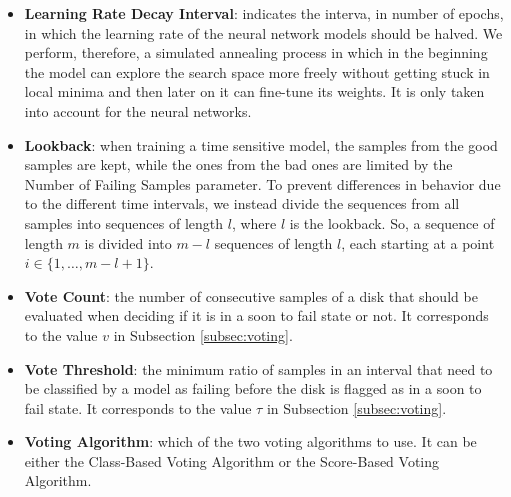 \begin{itemize}
  \item \textbf{Learning Rate Decay Interval}: indicates the interva, in number of epochs, in which the learning rate of the neural network models should be halved.
  We perform, therefore, a simulated annealing process in which in the beginning the model can explore the search space more freely without getting stuck in local minima and then later on it can fine-tune its weights.
  It is only taken into account for the neural networks.

  \item \textbf{Lookback}: when training a time sensitive model, the samples from the good samples are kept, while the ones from the bad ones are limited by the Number of Failing Samples parameter.
  To prevent differences in behavior due to the different time intervals, we instead divide the sequences from all samples into sequences of length $l$, where $l$ is the lookback.
  So, a sequence of length $m$ is divided into $m-l$ sequences of length $l$, each starting at a point $i \in \{1,\dots,m-l+1\}$.

  \item \textbf{Vote Count}: the number of consecutive samples of a disk that should be evaluated when deciding if it is in a soon to fail state or not.
  It corresponds to the value $v$ in Subsection \ref{subsec:voting}.

  \item \textbf{Vote Threshold}: the minimum ratio of samples in an interval that need to be classified by a model as failing before the disk is flagged as in a soon to fail state.
  It corresponds to the value $\tau$ in Subsection \ref{subsec:voting}.

  \item \textbf{Voting Algorithm}: which of the two voting algorithms to use.
  It can be either the Class-Based Voting Algorithm or the Score-Based Voting Algorithm.
  
\end{itemize}